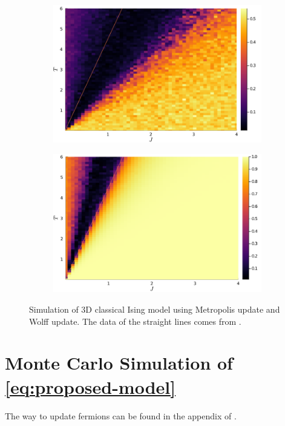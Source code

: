 \documentclass[hyperref, a4paper]{article}
\newcommand*{\cim}{classical Ising model }
\begin{document}
\begin{figure}
\begin{subfigure}{0.45\textwidth}
        \includegraphics[width=\textwidth]{../3d-ising-prototype/examples/isotropic/magnetization-wolff-random-init.PNG}
    \end{subfigure}
    \begin{subfigure}{0.45\textwidth}
        \includegraphics[width=\textwidth]{../3d-ising-prototype/examples/isotropic/magnetization-wolff-ones-init.PNG}
    \end{subfigure}
    \caption{Simulation of 3D \cim using Metropolis update and Wolff update. The data of the straight lines comes from \cite{Talapov_1996}.}
    \label{fig:3d-cim-benchmark}
\end{figure}

\section{Monte Carlo Simulation of \eqref{eq:proposed-model}}

The way to update fermions can be found in the appendix of \cite{Chen_2021}.


 
\end{document}
